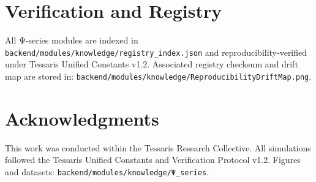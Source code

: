 \documentclass[12pt]{article}
\begin{document}
\section*{Verification and Registry}
All Ψ-series modules are indexed in \texttt{backend/modules/knowledge/registry\_index.json} and reproducibility-verified under Tessaris Unified Constants v1.2.  
Associated registry checksum and drift map are stored in:
\texttt{backend/modules/knowledge/ReproducibilityDriftMap.png}.

\section*{Acknowledgments}
This work was conducted within the Tessaris Research Collective.  
All simulations followed the Tessaris Unified Constants and Verification Protocol v1.2.  
Figures and datasets: \texttt{backend/modules/knowledge/Ψ\_series}.
\end{document}
